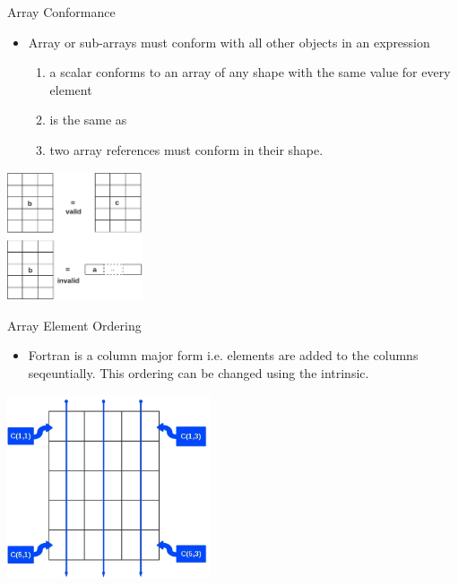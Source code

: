 \documentclass[10pt,t]{beamer}
\begin{document}
\begin{frame}{Array Conformance}
  \begin{itemize}
    \item Array or sub-arrays must conform with all other objects in an expression
      \begin{enumerate}
        \item a scalar conforms to an array of any shape with the same value for every element
        \item[]  is the same as 
        \item two array references must conform in their shape.
      \end{enumerate}
  \end{itemize}
  \begin{center}
    \includegraphics[width=4cm]{./graphics/array4}
  \end{center}
\end{frame}

\begin{frame}{Array Element Ordering}
  \begin{itemize}
    \item Fortran is a column major form i.e. elements are added to the columns seqeuntially. This ordering can be changed using the  intrinsic.
  \end{itemize}
  \begin{center}
    \includegraphics[width=6cm,clip=true]{./graphics/array5}
  \end{center}
\end{frame}
\end{document}
